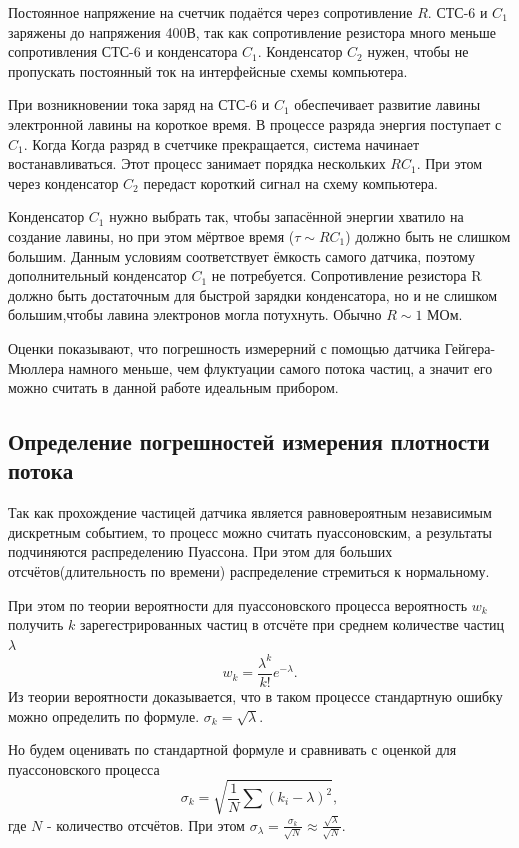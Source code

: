 \documentclass[12pt,a4paper]{article}
\begin{document}
Постоянное напряжение на счетчик подаётся через сопротивление $R$. СТС-6 и $C_1$ заряжены до напряжения 400В, так как сопротивление резистора много меньше сопротивления СТС-6 и конденсатора $C_1$. Конденсатор $C_2$ нужен, чтобы не пропускать постоянный ток на интерфейсные схемы компьютера.

При возникновении тока заряд на СТС-6 и $C_1$ обеспечивает развитие лавины электронной лавины на короткое время. В процессе разряда энергия поступает с $C_1$. Когда Когда разряд в счетчике прекращается, система начинает востанавливаться. Этот процесс занимает порядка нескольких $RC_1$. При этом через конденсатор $C_2$ передаст короткий сигнал на схему компьютера.

Конденсатор $C_1$ нужно выбрать так, чтобы запасённой энергии хватило на создание лавины, но при этом мёртвое время ($\tau \sim RC_1$) должно быть не слишком большим. Данным условиям соответствует ёмкость самого датчика, поэтому дополнительный конденсатор $C_1$ не потребуется. Сопротивление резистора R должно быть достаточным для быстрой зарядки конденсатора, но и не слишком большим,чтобы лавина электронов могла потухнуть. Обычно $R\sim1$ МОм.

Оценки показывают, что погрешность измерерний с помощью датчика Гейгера-Мюллера намного меньше, чем флуктуации самого потока частиц, а значит его можно считать в данной работе идеальным прибором.

\subsection{Определение погрешностей измерения плотности потока}
Так как прохождение частицей датчика является равновероятным независимым дискретным событием, то процесс можно считать пуассоновским, а результаты подчиняются распределению Пуассона. При этом для больших отсчётов(длительность по времени) распределение стремиться к нормальному.

При этом по теории вероятности для пуассоновского процесса вероятность $w_k$ получить $k$ зарегестрированных частиц в отсчёте при среднем количестве частиц $\lambda$
\begin{equation}
    w_k=\frac{\lambda^k}{k!}e^{-\lambda}.
\end{equation}
Из теории вероятности доказывается, что в таком процессе стандартную ошибку можно определить по формуле. $\sigma_k=\sqrt{\lambda}$.

Но будем оценивать по стандартной формуле и сравнивать с оценкой для пуассоновского процесса
\begin{equation}
\sigma _k = \sqrt{\frac{1}{N} \sum \left( k_i - \lambda \right)^2},
\end{equation}где $N$ - количество отсчётов.
При этом $\sigma_{\lambda}=\frac{\sigma _k}{\sqrt{N}}\approx\frac{\sqrt{\lambda}}{\sqrt{N}}$.
\end{document}

